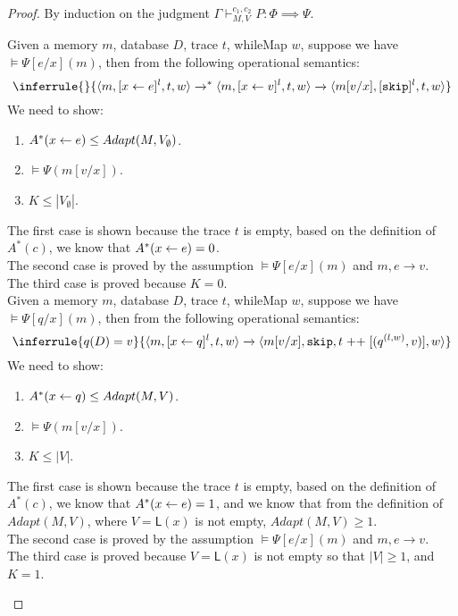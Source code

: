 \documentclass[a4paper,11pt]{article}
\begin{document}
\begin{proof}
 By induction on the judgment $\Gamma \vdash_{M,V}^{c_1, c_2} P: \Phi \implies \Psi$.
\\ 
\begin{itemize}
Given a memory $m$, database $D$, trace $t$, whileMap $w$, suppose we have $\vDash \Psi[e/x](m)$, then from the following operational semantics:
\[\inferrule
{
}
{\config{m, [\assign x e]^{l},  t,w} \xrightarrow{}^{*}
\config{m, [\assign x v]^{l},  t,w} \xrightarrow{} \config{m[v/x], [\eskip]^{l}, t,w}
}\]
We need to show:
\begin{enumerate}
    \item $ A^{*}( \mathrel{ x \leftarrow e } ) \leq Adapt(M, V_{\emptyset}) $.
    \item $\vDash \Psi(m[v/x])$.
    \item $K \leq |V_{\emptyset}| $.
\end{enumerate}
The first case is shown because the trace $t$ is empty, based on the definition of $A^{*}(c)$, we know that $A^{*}(\mathrel{ x \leftarrow e }) = 0$. \\
The second case is proved by the assumption $\vDash \Psi[e/x](m) $ and $m, e \rightarrow v$.\\
The third case is proved because $K =0$.\\

Given a memory $m$, database $D$, trace $t$, whileMap $w$, suppose we have $\vDash \Psi[q/x](m)$, then from the following operational semantics:
\[
\inferrule
{
q(D) = v 
}
{
\config{m, [\assign{x}{q}]^l, t, w} \xrightarrow{} \config{m[ v/ x], \eskip,  t \mathrel{++} [(q^{(l,w )},v)],w }
}
\]
We need to show:
\begin{enumerate}
    \item $ A^{*}( \mathrel{ x \leftarrow q }) \leq Adapt(M, V) $.
    \item $\vDash \Psi(m[v/x])$.
    \item $K \leq |V| $.
\end{enumerate}
The first case is shown because the trace $t$ is empty, based on the definition of $A^{*}(c)$, we know that $A^{*}(\mathrel{ x \leftarrow e }) = 1$, and we know that from the definition of $Adapt(M, V)$, where $V= \mathsf{L}(x)$ is not empty, $Adapt(M, V) \geq 1$.   \\
The second case is proved by the assumption $\vDash \Psi[e/x](m) $ and $m, e \rightarrow v$.\\
The third case is proved because $V= \mathsf{L}(x)$ is not empty so that $|V|\geq 1 $, and $K=1$. \\


\end{itemize}
\end{proof}
\end{document}
